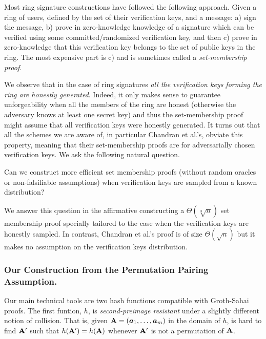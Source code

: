 
Most ring signature constructions have followed the following approach. Given a ring of users, defined by the set of their verification keys, and a message: a) sign the message, b) prove in zero-knowledge knowledge of a signature which can be verified using some committed/randomized verification key, and then c) prove in zero-knowledge that this verification key belongs to the set of public keys in the ring.  The most expensive part is c) and is sometimes called a \emph{set-membership proof}.

We observe that in the case of ring signatures \emph{all the verification keys forming the ring are honestly generated}. 
Indeed, it only makes sense to guarantee unforgeability when all the members of the ring are honest (otherwise the adversary knows at least one secret key) and thus the set-membership proof might assume that all verification keys were honestly generated.
It turns out that all the schemes we are aware of, in particular Chandran et al.'s, obviate this property, meaning that their set-membership proofs are for adversarially chosen verification keys.
We ask the following natural question.
\begin{displayquote}
Can we construct more efficient set membership proofs (without random oracles or non-falsifiable assumptions) when verification keys are sampled from a known distribution?
\end{displayquote}
We answer this question in the affirmative constructing a $\Theta(\sqrt[3]{n})$ set membership proof specially tailored to the case when the verification keys are honestly sampled. In contrast, Chandran et al.'s proof is of size $\Theta(\sqrt{n})$ but it makes no assumption on the verification keys distribution.

\subsubsection{Our Construction from the Permutation Pairing Assumption.}
Our main technical tools are two hash functions compatible with Groth-Sahai proofs. The first funtion, $h$, is \emph{second-preimage resistant} under a slightly different notion of collision. That is, given $\mathbf{{A}}=({\boldsymbol{a}}_1,\ldots,\allowbreak {\boldsymbol{a}}_m)$ in the domain of $h$, is hard to find $\mathbf{{A}}'$ such that $h(\mathbf{{A}}')=h(\mathbf{{A}})$ whenever $\mathbf{{A}}'$ is not a permutation of $\mathbf{{A}}$.


